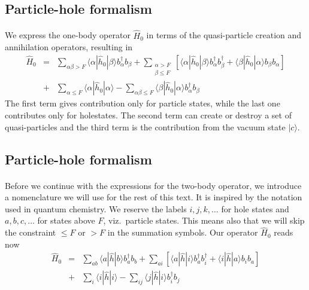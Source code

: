 \documentclass[%
twoside,                 %
final,                   %
10pt]{article}
\begin{document}
\subsection*{Particle-hole formalism}

\paragraph{}
We express the one-body operator $\hat{H}_0$ in terms of the quasi-particle creation and annihilation operators, resulting in
\begin{eqnarray}
	\hat{H}_0 &=& \sum_{\alpha\beta > F} \langle \alpha|\hat{h}_0|\beta\rangle  b_\alpha^\dagger b_\beta +
		\sum_{\begin{array}{c} \alpha > F \\ \beta \leq F \end{array}} \left[
		\langle \alpha|\hat{h}_0|\beta\rangle b_\alpha^\dagger b_\beta^\dagger + 
		\langle \beta|\hat{h}_0|\alpha\rangle b_\beta  b_\alpha \right] \nonumber \\
	&+& \sum_{\alpha \leq F} \langle \alpha|\hat{h}_0|\alpha\rangle - 
		\sum_{\alpha\beta \leq F} \langle \beta|\hat{h}_0|\alpha\rangle
		b_\alpha^\dagger b_\beta \label{eq:2-63b}
\end{eqnarray}
The first term  gives contribution only for particle states, while the last one
contributes only for holestates. The second term can create or destroy a set of
quasi-particles and 
the third term is the contribution  from the vacuum state $|c\rangle$.





\subsection*{Particle-hole formalism}

\paragraph{}
Before we continue with the expressions for the two-body operator, we introduce a nomenclature we will use for the rest of this
text. It is inspired by the notation used in quantum chemistry.
We reserve the labels $i,j,k,\dots$ for hole states and $a,b,c,\dots$ for states above $F$, viz.~particle states.
This means also that we will skip the constraint $\leq F$ or $> F$ in the summation symbols. 
Our operator $\hat{H}_0$  reads now 
\begin{eqnarray}
	\hat{H}_0 &=& \sum_{ab} \langle a|\hat{h}|b\rangle b_a^\dagger b_b +
		\sum_{ai} \left[
		\langle a|\hat{h}|i\rangle b_a^\dagger b_i^\dagger + 
		\langle i|\hat{h}|a\rangle b_i  b_a \right] \nonumber \\
	&+& \sum_{i} \langle i|\hat{h}|i\rangle - 
		\sum_{ij} \langle j|\hat{h}|i\rangle
		b_i^\dagger b_j \label{eq:2-63b}
\end{eqnarray}
\end{document}
